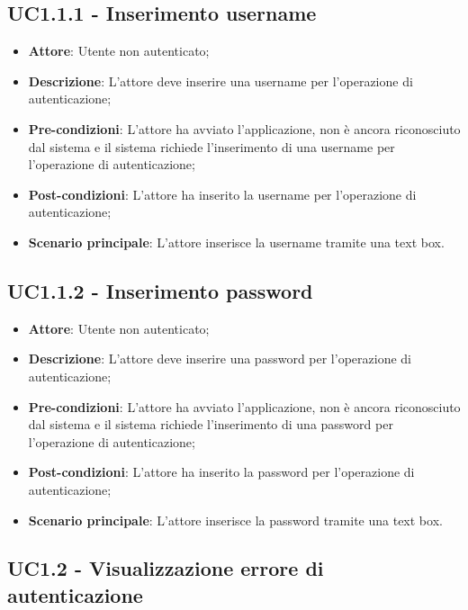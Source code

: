 \subsection{UC1.1.1 - Inserimento username}

\begin{itemize}
	\item \textbf{Attore}: Utente non autenticato;
	\item \textbf{Descrizione}: L'attore deve inserire una username per l'operazione di autenticazione;
	\item \textbf{Pre-condizioni}: L'attore ha avviato l'applicazione, non è ancora riconosciuto dal sistema e il sistema richiede l'inserimento di una username per l'operazione di autenticazione;
	\item \textbf{Post-condizioni}: L'attore ha inserito la username per l'operazione di autenticazione;
	\item \textbf{Scenario principale}: L'attore inserisce la username tramite una text box.
\end{itemize}

\subsection{UC1.1.2 - Inserimento password}

\begin{itemize}
	\item \textbf{Attore}: Utente non autenticato;
	\item \textbf{Descrizione}: L'attore deve inserire una password per l'operazione di autenticazione;
	\item \textbf{Pre-condizioni}: L'attore ha avviato l'applicazione, non è ancora riconosciuto dal sistema e il sistema richiede l'inserimento di una password per l'operazione di autenticazione;
	\item \textbf{Post-condizioni}: L'attore ha inserito la password per l'operazione di autenticazione;
	\item \textbf{Scenario principale}: L'attore inserisce la password tramite una text box.
\end{itemize}

\subsection{UC1.2 - Visualizzazione errore di autenticazione}

